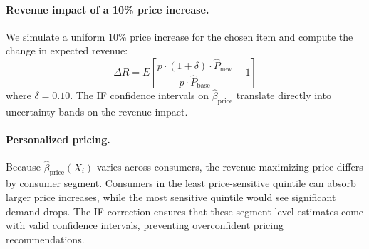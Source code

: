 \paragraph{Revenue impact of a 10\% price increase.} We simulate a uniform 10\% price increase for the chosen item and compute the change in expected revenue:
\begin{equation}
    \Delta R = E\left[\frac{p \cdot (1+\delta) \cdot \hat{P}_{\text{new}}}{p \cdot \hat{P}_{\text{base}}} - 1\right]
\end{equation}
where $\delta = 0.10$. The IF confidence intervals on $\hat{\beta}_{\text{price}}$ translate directly into uncertainty bands on the revenue impact.

\paragraph{Personalized pricing.} Because $\hat{\beta}_{\text{price}}(X_i)$ varies across consumers, the revenue-maximizing price differs by consumer segment. Consumers in the least price-sensitive quintile can absorb larger price increases, while the most sensitive quintile would see significant demand drops. The IF correction ensures that these segment-level estimates come with valid confidence intervals, preventing overconfident pricing recommendations.
